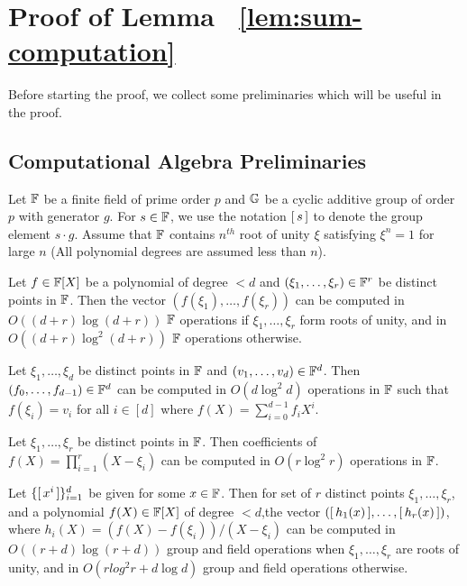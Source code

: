 \section{Proof of Lemma ~\ref{lem:sum-computation}}
Before starting the proof, we collect some preliminaries which will be useful in the proof.

\subsection{Computational Algebra Preliminaries}\label{subsec:comp-algebra-app}
Let $\mathbb{F}$ be a finite field of prime order $p$ and $\mathbb{G}$ be a cyclic additive group of order $p$ with generator $g$. For $s \in \mathbb{F}$, we use
the notation $[\,{s}\,]$ to denote the group element $s\cdot g$. Assume that $\mathbb{F}$ contains $n^{th}$ root of unity $\xi$
satisfying $\xi^n=1$ for large $n$ (All polynomial degrees are assumed less than $n$).

\begin{fact}\label{fc:fft}
Let $f\in \mathbb{F}[X]$ be a polynomial of degree $<d$ and $(\xi_1,\ldots,\xi_r)\in \mathbb{F}^r$ be distinct points in $\mathbb{F}$.
Then the vector $(f(\xi_1),\ldots,f(\xi_r))$ can be computed in $O((d+r)\log (d+r))$ $\mathbb{F}$ operations if $\xi_1,\ldots,\xi_r$ form roots
of unity, and in $O((d+r)\log^2(d+r))$ $\mathbb{F}$ operations otherwise.
\end{fact}

\begin{fact}\label{fc:ifft}
Let $\xi_1,\ldots,\xi_d$ be distinct points in $\mathbb{F}$ and $(v_1,\ldots,v_d)\in \mathbb{F}^d$. Then $(f_0,\ldots,f_{d-1})\in \mathbb{F}^d$
can be computed in $O(d\log^2 d)$ operations in $\mathbb{F}$ such that $f(\xi_i)=v_i$ for all $i\in [d]$ where
$f(X)=\sum_{i=0}^{d-1}f_iX^i$.
\end{fact}

\begin{fact}\label{fc:mult}
Let $\xi_1,\ldots,\xi_r$ be distinct points in $\mathbb{F}$. Then coefficients of $f(X)=\prod_{i=1}^r (X-\xi_i)$
can be computed in $O(r\log^2 r)$ operations in $\mathbb{F}$.
\end{fact}

\begin{fact}\label{fc:multkzg}
Let $\{[\,{x^i}\,]\}_{i=1}^d$ be given for some $x\in \mathbb{F}$. Then for set of $r$ distinct points $\xi_1,\ldots,\xi_r$,
and a polynomial $f(X)\in \mathbb{F}[X]$ of degree $<d$,the vector $([\,{h_1(x)}\,],\ldots,[\,{h_r(x)}\,])$,
where $h_i(X) = (f(X) - f(\xi_i))/(X - \xi_i)$ can be computed in
$O((r+d)\log(r+d))$ group and field operations when $\xi_1,\ldots,\xi_r$ are roots of unity, and in
$O(rlog^2 r + d\log d)$ group and field operations otherwise.
\end{fact}

